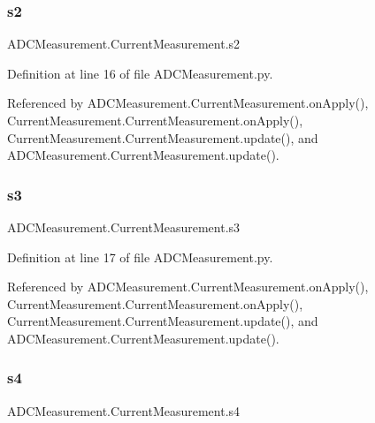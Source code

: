 \subsubsection{\texorpdfstring{s2}{s2}}
{\footnotesize\ttfamily A\+D\+C\+Measurement.\+Current\+Measurement.\+s2}



Definition at line 16 of file A\+D\+C\+Measurement.\+py.



Referenced by A\+D\+C\+Measurement.\+Current\+Measurement.\+on\+Apply(), Current\+Measurement.\+Current\+Measurement.\+on\+Apply(), Current\+Measurement.\+Current\+Measurement.\+update(), and A\+D\+C\+Measurement.\+Current\+Measurement.\+update().

\mbox{\label{classADCMeasurement_1_1CurrentMeasurement_a6fb15bf8899950a9cb87f35c33595586}} 
\subsubsection{\texorpdfstring{s3}{s3}}
{\footnotesize\ttfamily A\+D\+C\+Measurement.\+Current\+Measurement.\+s3}



Definition at line 17 of file A\+D\+C\+Measurement.\+py.



Referenced by A\+D\+C\+Measurement.\+Current\+Measurement.\+on\+Apply(), Current\+Measurement.\+Current\+Measurement.\+on\+Apply(), Current\+Measurement.\+Current\+Measurement.\+update(), and A\+D\+C\+Measurement.\+Current\+Measurement.\+update().

\mbox{\label{classADCMeasurement_1_1CurrentMeasurement_a506aa9010df3a05e20606be1ee4f4c5b}} 
\subsubsection{\texorpdfstring{s4}{s4}}
{\footnotesize\ttfamily A\+D\+C\+Measurement.\+Current\+Measurement.\+s4}



